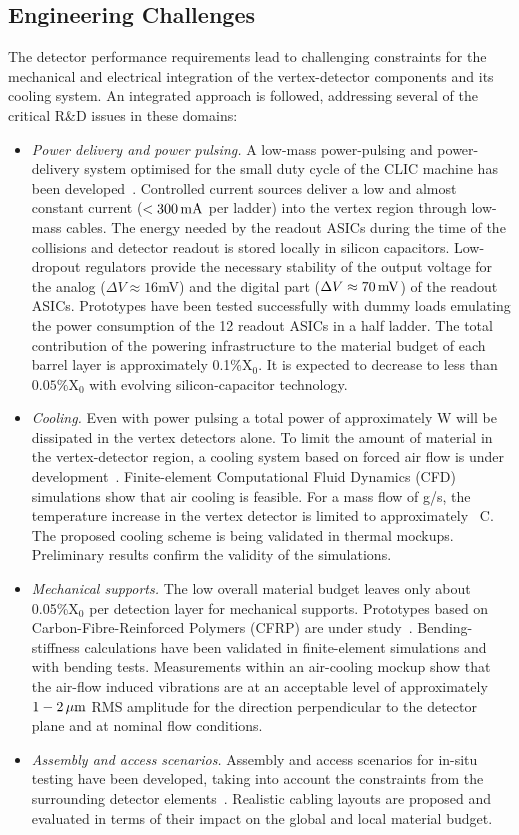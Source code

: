 \subsection{Engineering Challenges}
The detector performance requirements lead to challenging constraints
for the mechanical and electrical integration of the vertex-detector
components and its cooling system. An integrated approach is followed,
addressing several of the critical R\&D issues in these domains:
\begin{itemize}
\item \emph{Power delivery and power pulsing.} A low-mass power-pulsing and power-delivery
system optimised for the small duty cycle of the CLIC machine has been
developed~\cite{fuentes-twepp2013}. Controlled current sources
deliver a low and almost constant current ($<\unit[300]{mA}$ per ladder)
into the vertex region through low-mass cables. The energy needed by the readout ASICs during the time of the collisions
and detector readout is stored locally in silicon capacitors. Low-dropout regulators provide the necessary stability
of the output voltage for the analog ($\Delta V\approx16$mV) and the digital part
($\Delta V\approx\unit[70]{mV}$) of the readout ASICs.
Prototypes have been tested successfully with dummy loads emulating the power consumption
of the 12 readout ASICs in a half ladder. The total contribution of the
powering infrastructure to the material budget of each barrel layer is
approximately 0.1\%X$_0$. It is expected to decrease to less than $0.05\%$X$_0$ with evolving silicon-capacitor technology.
\item \emph{Cooling.} Even with power pulsing a total power of approximately \unit[500]{W} will be dissipated in the vertex detectors alone. To limit the amount of material in the vertex-detector region, a cooling
system based on forced air flow is under development~\cite{DuarteRamos:1572989}. Finite-element Computational Fluid Dynamics (CFD) simulations show that air cooling is feasible. For a mass flow of \unit[20]{g/s}, the temperature increase
in the vertex detector is limited to approximately \unit[40]{\textdegree C}. The proposed cooling scheme is being
validated in thermal mockups. Preliminary results confirm the validity of the simulations.
\item \emph{Mechanical supports.} The low overall material budget leaves only about 0.05\%X$_0$ per
detection layer for mechanical supports. Prototypes based on Carbon-Fibre-Reinforced Polymers
(CFRP) are under study~\cite{VillarejoBermudez:1982810}. Bending-stiffness calculations have been validated in
finite-element simulations
and with bending tests. Measurements within an air-cooling mockup show
that the air-flow induced vibrations are at an acceptable level of approximately $\unit[1-2]{\micron}$ RMS
amplitude for the direction perpendicular to the detector plane and at nominal flow conditions.
\item \emph{Assembly and access scenarios.}
Assembly and access scenarios for in-situ testing have been developed,
taking into account the constraints from the surrounding detector elements~\cite{VillarejoBermudez:1982810}.
Realistic cabling layouts are proposed and evaluated in terms of their impact on the
global and local material budget.
\end{itemize}
